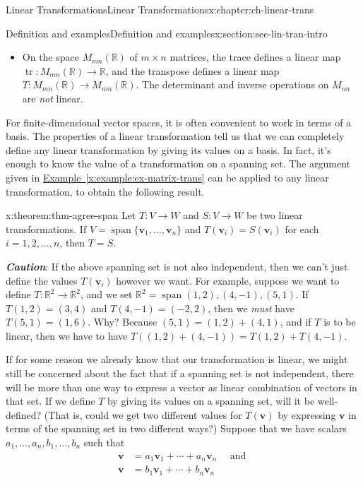 \documentclass[oneside,10pt,]{book}
\newcommand{\xreffont}{\relax}
\newcommand{\alert}[1]{\textbf{\textit{#1}}}
\numberwithin{equation}{section}
\newcommand{\spn}{\operatorname{span}}
\newcommand{\R}{\mathbb{R}}
\newcommand{\vv}{\mathbf{v}}
\newcommand{\amp}{&}
\begin{document}
\begin{chapterptx}{Linear Transformations}{}{Linear Transformations}{}{}{x:chapter:ch-linear-trans}
\begin{sectionptx}{Definition and examples}{}{Definition and examples}{}{}{x:section:sec-lin-tran-intro}
\begin{itemize}[label=\textbullet]
\begin{align*}
S_R(a_1,a_2,a_3,\ldots) \amp = (0,a_1,a_2,\ldots)
\end{align*}
are both linear.%
\item{}On the space \(M_{mn}(\R)\) of \(m\times n\) matrices, the trace defines a linear map \(\operatorname{tr}:M_{mn}(\R)\to \R\), and the transpose defines a linear map \(T:M_{mn}(\R)\to M_{nm}(\R)\). The determinant and inverse operations on \(M_{nn}\) are \emph{not} linear.%
\end{itemize}
%
\par
For finite-dimensional vector spaces, it is often convenient to work in terms of a basis. The properties of a linear transformation tell us that we can completely define any linear transformation by giving its values on a basis. In fact, it's enough to know the value of a transformation on a spanning set. The argument given in \hyperref[x:example:ex-matrix-trans]{Example~{\xreffont\ref{x:example:ex-matrix-trans}}} can be applied to any linear transformation, to obtain the following result.%
\begin{theorem}{}{}{x:theorem:thm-agree-span}%
Let \(T:V\to W\) and \(S:V\to W\) be two linear transformations. If \(V = \spn\{\vv_1,\ldots, \vv_n\}\) and \(T(\vv_i)=S(\vv_i)\) for each \(i=1,2,\ldots, n\), then \(T=S\).%
\end{theorem}
\alert{Caution}: If the above spanning set is not also independent, then we can't just define the values \(T(\vv_i)\) however we want. For example, suppose we want to define \(T:\R^2\to\R^2\), and we set \(\R^2=\spn{(1,2),(4,-1),(5,1)}\). If \(T(1,2)=(3,4)\) and \(T(4,-1)=(-2,2)\), then we \emph{must} have \(T(5,1)=(1,6)\). Why? Because \((5,1)=(1,2)+(4,1)\), and if \(T\) is to be linear, then we have to have \(T((1,2)+(4,-1))=T(1,2)+T(4,-1)\).%
\par
If for some reason we already know that our transformation is linear, we might still be concerned about the fact that if a spanning set is not independent, there will be more than one way to express a vector as linear combination of vectors in that set. If we define \(T\) by giving its values on a spanning set, will it be well-defined? (That is, could we get two different values for \(T(\vv)\) by expressing \(\vv\) in terms of the spanning set in two different ways?) Suppose that we have scalars \(a_1,\ldots, a_n, b_1,\ldots, b_n\) such that%
\begin{align*}
\vv \amp = a_1\vv_1+\cdots + a_n\vv_n \quad \text{ and }\\
\vv \amp = b_1\vv_1+\cdots + b_n\vv_n
\end{align*}

\end{sectionptx}
\end{chapterptx}
\end{document}
